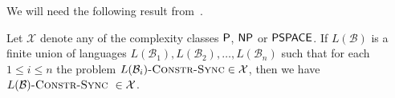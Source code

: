 \begin{comment}
Between the commutative languages over $\Sigma$
and the strictly bounded languages in $a_1^* \cdots a_k^*$, the mappings
\[
\Phi(L) = L \cap a_1^* \cdots a_k^* \quad\mbox{and}\quad
\perm(L) = \{ u \mid \psi(u) \in \psi(L) \}
\]
are mutually inverse and inclusion preserving. %
Furthermore, for strictly bounded languages of the form $A_1 \cdots A_k \subseteq a_1^* \cdots a_k^*$
with $A_j \subseteq a_j^*$, $j \in \{1,\ldots, k\}$, we have
\[
 \perm(A_1 \cdots A_k) = A_1 \shuffle \cdots \shuffle A_k.
\]
Theorem~\ref{thm:bounded_regular_form}, with the help of these observations
and in its formulation
for strictly bounded languages, and
Theorem~\ref{thm:reg_commutative_form}
could be derived from each other.
It also implies that the commutative closure is regularity-preserving
for strictly bounded languages\footnote{However, this is not true
for general bounded languages, as $\perm((ab)^*) = \{ w \in \{a,b\}^* \mid |w|_a = |w|_b \}$
is not regular.}. 
More specifically, the above correspondence between
the two language classes is regularity-preserving.
The close relation between the commutative and the strictly bounded languages
motivates to also study the constrained synchronization problem
for strictly bounded constraint languages. As a classification for the former
was achieved~\cite{DBLP:conf/cocoon/Hoffmann20}, a classification
for the latter seems achievable.
However, the methods used in~\cite{DBLP:conf/cocoon/Hoffmann20}
are not directly applicable to strictly bounded languages.
For commutative constraint languages, we can realize $\PSPACE$-complete
problems, but, as we will derive from a more general result from~\cite{DBLP:conf/ictcs/Hoffmann20},
for strictly bounded languages, the constrained problem is always in $\NP$.
Moreover, we will prove that only problems in $\PTIME$
or $\NP$-complete problem are realizable with these constraint languages.
So, we have a dichotomy result for strictly bounded constraint languages.
\end{toappendix}
\end{comment}

 
\begin{toappendix}


We will need the following result from~\cite{DBLP:conf/cocoon/Hoffmann20}.

\begin{lemma}
	\label{lem:union}
	Let $\mathcal X$ denote any of the complexity classes
	$\textsf{P}$, $\textsf{NP}$ or $\textsf{PSPACE}$.
	If $L(\mathcal B)$ is a finite union of languages $L(\mathcal B_1),
	L(\mathcal B_2), \dots, L(\mathcal B_n)$ such that for each $1\leq i\leq n$
the problem $L(\mathcal B_i)\textsc{-Constr-Sync}\in \mathcal X$, 
	then we have $L(\mathcal B)\textsc{-Constr-Sync } \in \mathcal X$.
\end{lemma}
\end{toappendix}


